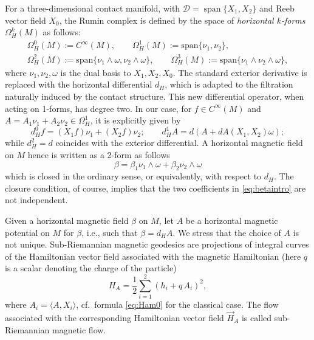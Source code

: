 \documentclass{amsart}
\theoremstyle{plain}
\theoremstyle{definition}
\theoremstyle{remark}
\newcommand{\blue}{\color{blue}}
\newcommand{\diff}{d}%
\newcommand{\distr}{\mathcal{D}}								%
\newcommand{\B}{\beta}
\begin{document}
For a three-dimensional contact manifold, with $\distr=\operatorname{span}\{X_1,X_2\}$ and Reeb vector field $X_0$, the Rumin complex is defined by the space of  \emph{horizontal $k$-forms} $\Omega^k_H(M)$ as follows:
\begin{gather}
\Omega^0_H(M):=C^\infty(M),\qquad 
\Omega^1_H(M):=\mathrm{span}\{\nu_1,\nu_2\},\\ %
\Omega^2_H(M):=\mathrm{span}\{\nu_1\wedge\omega,\nu_2\wedge\omega\}, \qquad
\Omega^3_H(M):=\mathrm{span}\{\nu_1\wedge\nu_2 \wedge \omega\},
\end{gather}
where $\nu_1,\nu_2,\omega$ is the dual basis to  $X_1,X_2,X_0$. The standard exterior derivative is replaced with the horizontal differential $\diff_H$, which is adapted to the filtration naturally induced by the contact structure. 
This new differential operator, when acting on 1-forms, has degree two. In our case, for $f\in C^{\infty}(M)$ and $A=A_1\nu_1+A_2\nu_2\in \Omega_H^1$,
it is explicitly given by \begin{equation}
		\diff^0_H f %
		=(X_1f)\nu_1+(X_2f)\nu_2;\qquad 
		\diff^1_HA=\diff\left(A+\diff A(X_1,X_2)\omega\right);
	\end{equation}
while $\diff^2_H=\diff$ coincides with the exterior differential.  A horizontal magnetic field on $M$ hence is written as a 2-form as follows
\begin{equation} \label{eq:betaintro}
\beta=\beta_{1}\nu_{1}\wedge \omega+\beta_{2}\nu_{2}\wedge \omega
\end{equation}
which is closed in the ordinary sense, or equivalently, with respect to $\diff_{H}$. The closure condition, of course, implies that the two coefficients in \eqref{eq:betaintro} are not independent.





Given a horizontal magnetic field  $\B$ on $M$, let $A$ be a horizontal magnetic potential on $M$ for $\beta$, i.e., such that $\beta=\diff_{H}A$. We stress that the choice of $A$ is not unique.   Sub-Riemannian magnetic geodesics are projections of integral curves of the Hamiltonian vector field associated with the magnetic Hamiltonian (here $q$ is a scalar denoting the charge of the particle)
\begin{equation}\label{eq:accam}
H_{A}=\frac{1}{2}\sum_{i=1}^{2}(h_{i}+q\,A_{i})^{2},
\end{equation}
where $A_{i}=\langle A,X_{i} \rangle$, cf.\ formula \eqref{eq:Ham0} for the classical case. The flow associated with the corresponding Hamiltonian vector field $ \vec{H}_{A}$ is called sub-Riemannian magnetic flow.
\end{document}
